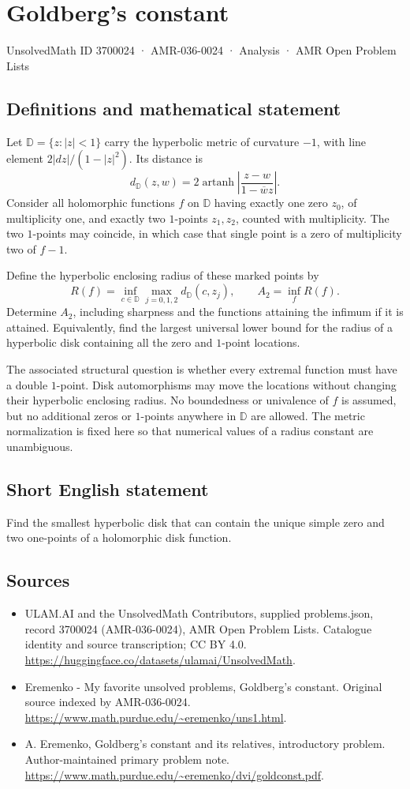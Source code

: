 \documentclass[11pt,a4paper]{article}
\begin{document}
\section*{Goldberg's constant}\label{3700024}
{\small UnsolvedMath ID 3700024 · AMR-036-0024 · Analysis · AMR Open Problem Lists}
\subsection{Definitions and mathematical statement}
Let $\mathbb D=\{z:|z|<1\}$ carry the hyperbolic metric
of curvature $-1$, with line element
$2|dz|/(1-|z|^2)$. Its distance is
\[
 d_{\mathbb D}(z,w)=2\operatorname{artanh}
                 \left|\frac{z-w}{1-\overline w z}\right|.
\]
Consider all holomorphic functions $f$ on $\mathbb D$
having exactly one zero $z_0$, of multiplicity one, and
exactly two $1$-points $z_1,z_2$, counted with multiplicity.
The two $1$-points may coincide, in which case that
single point is a zero of multiplicity two of $f-1$.

Define the hyperbolic enclosing radius of these marked
points by
\[
 R(f)=\inf_{c\in\mathbb D}
            \max_{j=0,1,2}d_{\mathbb D}(c,z_j),
 \qquad A_2=\inf_f R(f).
\]
Determine $A_2$, including sharpness and the functions
attaining the infimum if it is attained. Equivalently,
find the largest universal lower bound for the radius
of a hyperbolic disk containing all the zero and
$1$-point locations.

The associated structural question is whether every
extremal function must have a double $1$-point.
Disk automorphisms may move the locations without changing
their hyperbolic enclosing radius. No boundedness or
univalence of $f$ is assumed, but no additional zeros
or $1$-points anywhere in $\mathbb D$ are allowed.
The metric normalization is fixed here so that numerical
values of a radius constant are unambiguous.
\subsection{Short English statement}
Find the smallest hyperbolic disk that can contain the unique simple zero and two one-points of a holomorphic disk function.
\subsection{Sources}
\begin{itemize}
\item[S1] ULAM.AI and the UnsolvedMath Contributors, supplied problems.json, record 3700024 (AMR-036-0024), AMR Open Problem Lists. Catalogue identity and source transcription; CC BY 4.0.
\url{https://huggingface.co/datasets/ulamai/UnsolvedMath}.
\item[S2] Eremenko - My favorite unsolved problems, Goldberg's constant. Original source indexed by AMR-036-0024.
\url{https://www.math.purdue.edu/~eremenko/uns1.html}.
\item[S3] A. Eremenko, Goldberg's constant and its relatives, introductory problem. Author-maintained primary problem note.
\url{https://www.math.purdue.edu/~eremenko/dvi/goldconst.pdf}.
\end{itemize}
\end{document}
